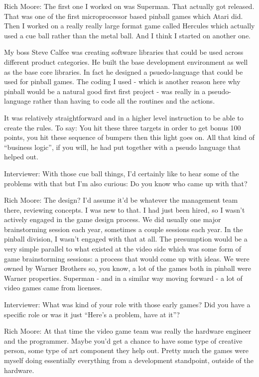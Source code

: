\textcolor{interviewee}{Rich Moore:} The first one I worked on was Superman. That actually got released. That was one of the first microprocessor based pinball games which Atari did. Then I worked on a really really large format game called Hercules which actually used a cue ball rather than the metal ball. And I think I started on another one.

My boss Steve Calfee was creating software libraries that could be used across different product categories. He built the base development environment as well as the base core libraries. In fact he designed a psuedo-language that could be used for pinball games. The coding I used - which is another reason here why pinball would be a natural good first first project - was really in a pseudo-language rather than having to code all the routines and the actions. 

It was relatively straightforward and in a higher level instruction to be able to create the rules. To say: You hit these three targets in order to get bonus 100 points, you hit these sequence of bumpers then this light goes on. All that kind of “business logic”, if you will, he had put together with a pseudo language that helped out.

\textcolor{interviewer}{Interviewer:} With those cue ball things, I’d certainly like to hear some of the problems with that but I'm also curious: Do you know who came up with that?

\textcolor{interviewee}{Rich Moore:} The design? I’d assume it’d be whatever the management team there, reviewing concepts. I was new to that. I had just been hired, so I wasn’t actively engaged in the game design process. We did usually one major brainstorming session each year, sometimes a couple sessions each year. In the pinball division, I wasn’t engaged with that at all. The presumption would be a very simple parallel to what existed at the video side which was some form of game brainstorming sessions: a process that would come up with ideas. We were owned by Warner Brothers so, you know, a lot of the games both in pinball were Warner properties. Superman - and in a similar way moving forward - a lot of video games came from licenses.

\textcolor{interviewer}{Interviewer:} What was kind of your role with those early games? Did you have a specific role or was it just “Here's a problem, have at it”?

\textcolor{interviewee}{Rich Moore:} At that time the video game team was really the hardware engineer and the programmer. Maybe you’d get a chance to have some type of creative person, some type of art component they help out. Pretty much the games were myself doing essentially everything from a development standpoint, outside of the hardware.

